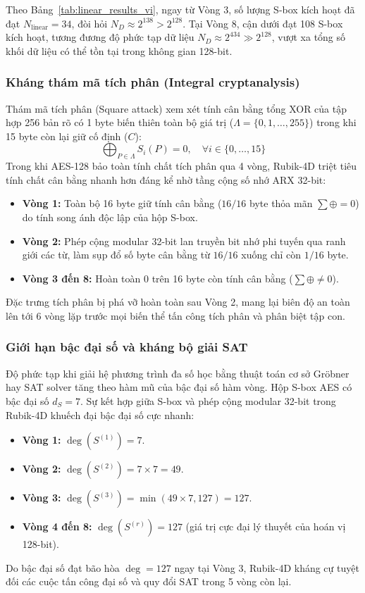 \documentclass[10pt,twocolumn]{article}
\begin{document}
Theo Bảng~\ref{tab:linear_results_vi}, ngay từ Vòng 3, số lượng S-box kích hoạt đã đạt $N_{\text{linear}} = 34$, đòi hỏi $N_D \approx 2^{138} > 2^{128}$. Tại Vòng 8, cận dưới đạt 108 S-box kích hoạt, tương đương độ phức tạp dữ liệu $N_D \approx 2^{434} \gg 2^{128}$, vượt xa tổng số khối dữ liệu có thể tồn tại trong không gian 128-bit.

\subsubsection{Kháng thám mã tích phân (Integral cryptanalysis)}
Thám mã tích phân (Square attack) xem xét tính cân bằng tổng XOR của tập hợp 256 bản rõ có 1 byte biến thiên toàn bộ giá trị ($\Lambda = \{0, 1, \dots, 255\}$) trong khi 15 byte còn lại giữ cố định ($C$):
\begin{equation}
    \bigoplus_{P \in \Lambda} S_i(P) = 0, \quad \forall i \in \{0, \dots, 15\}
\end{equation}
Trong khi AES-128 bảo toàn tính chất tích phân qua 4 vòng, Rubik-4D triệt tiêu tính chất cân bằng nhanh hơn đáng kể nhờ tầng cộng số nhớ ARX 32-bit:
\begin{itemize}
    \item \textbf{Vòng 1:} Toàn bộ 16 byte giữ tính cân bằng ($16/16$ byte thỏa mãn $\sum \oplus = 0$) do tính song ánh độc lập của hộp S-box.
    \item \textbf{Vòng 2:} Phép cộng modular 32-bit lan truyền bit nhớ phi tuyến qua ranh giới các từ, làm sụp đổ số byte cân bằng từ $16/16$ xuống chỉ còn $1/16$ byte.
    \item \textbf{Vòng 3 đến 8:} Hoàn toàn 0 trên 16 byte còn tính cân bằng ($\sum \oplus \neq 0$).
\end{itemize}
Đặc trưng tích phân bị phá vỡ hoàn toàn sau Vòng 2, mang lại biên độ an toàn lên tới 6 vòng lặp trước mọi biến thể tấn công tích phân và phân biệt tập con.

\subsubsection{Giới hạn bậc đại số và kháng bộ giải SAT}
Độ phức tạp khi giải hệ phương trình đa số học bằng thuật toán cơ sở Gröbner hay SAT solver tăng theo hàm mũ của bậc đại số hàm vòng. Hộp S-box AES có bậc đại số $d_S = 7$. Sự kết hợp giữa S-box và phép cộng modular 32-bit trong Rubik-4D khuếch đại bậc đại số cực nhanh:
\begin{itemize}
    \item \textbf{Vòng 1:} $\deg(S^{(1)}) = 7$.
    \item \textbf{Vòng 2:} $\deg(S^{(2)}) = 7 \times 7 = 49$.
    \item \textbf{Vòng 3:} $\deg(S^{(3)}) = \min(49 \times 7, 127) = 127$.
    \item \textbf{Vòng 4 đến 8:} $\deg(S^{(r)}) = 127$ (giá trị cực đại lý thuyết của hoán vị 128-bit).
\end{itemize}
Do bậc đại số đạt bão hòa $\deg = 127$ ngay tại Vòng 3, Rubik-4D kháng cự tuyệt đối các cuộc tấn công đại số và quy đổi SAT trong 5 vòng còn lại.
\end{document}

